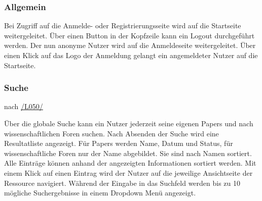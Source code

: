 \subsubsection{Allgemein}
\begin{description}
     Bei Zugriff auf die Anmelde- oder Registrierungsseite
    wird auf die Startseite weitergeleitet.
     Über einen Button in der Kopfzeile kann ein Logout durchgeführt werden.
    Der nun anonyme Nutzer wird auf die Anmeldeseite weitergeleitet.
     Über einen Klick auf das Logo der Anmeldung gelangt ein angemeldeter Nutzer auf die
    Startseite.
\end{description}

\subsubsection{Suche} nach \hyperref[leist:050]{/L050/}
\begin{description}
     Über die globale Suche kann ein Nutzer jederzeit seine eigenen Papers und nach wissenschaftlichen Foren
    suchen. Nach Absenden der Suche wird eine Resultatliste angezeigt. Für Papers werden Name, Datum und Status, für
    wissenschaftliche Foren nur der Name abgebildet.
    Sie sind nach Namen sortiert.
     Alle Einträge können anhand der angezeigten Informationen sortiert werden.
    Mit einem Klick auf einen Eintrag wird der Nutzer auf die jeweilige Ansichtseite
    der Ressource navigiert.
     Während der Eingabe in das Suchfeld werden bis zu 10 mögliche Suchergebnisse in
    einem Dropdown Menü angezeigt.
\end{description}

